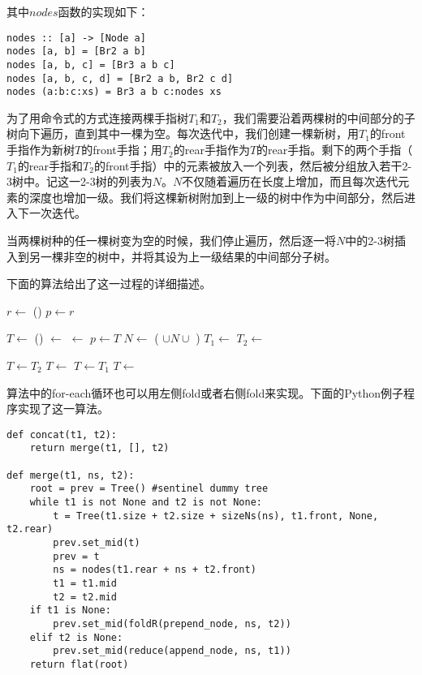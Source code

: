 \documentclass[UTF8]{article}
\begin{document}
其中$nodes$函数的实现如下：

\begin{lstlisting}[style=Haskell]
nodes :: [a] -> [Node a]
nodes [a, b] = [Br2 a b]
nodes [a, b, c] = [Br3 a b c]
nodes [a, b, c, d] = [Br2 a b, Br2 c d]
nodes (a:b:c:xs) = Br3 a b c:nodes xs
\end{lstlisting}

为了用命令式的方式连接两棵手指树$T_1$和$T_2$，我们需要沿着两棵树的中间部分的子树向下遍历，直到其中一棵为空。每次迭代中，我们创建一棵新树，用$T_1$的front手指作为新树$T$的front手指；用$T_2$的rear手指作为$T$的rear手指。剩下的两个手指（$T_1$的rear手指和$T_2$的front手指）中的元素被放入一个列表，然后被分组放入若干2-3树中。记这一2-3树的列表为$N$。$N$不仅随着遍历在长度上增加，而且每次迭代元素的深度也增加一级。我们将这棵新树附加到上一级的树中作为中间部分，然后进入下一次迭代。

当两棵树种的任一棵树变为空的时候，我们停止遍历，然后逐一将$N$中的2-3树插入到另一棵非空的树中，并将其设为上一级结果的中间部分子树。

下面的算法给出了这一过程的详细描述。

\begin{algorithmic}
  \State \Return {}
\EndFunction
\Statex
{}
  \State $r \gets$ ()
  \State $p \gets r$

    \State $T \gets$ ()
    \State {} $\gets$ 
    \State {} $\gets$ 
    \State {}
    \State $p \gets T$
    \State $N \gets$ ( $\cup N \cup$ )
    \State $T_1 \gets$ 
    \State $T_2 \gets$ 
  \EndWhile

    \State $T \gets T_2$
      \State $T \gets$ 
    \EndFor
    \State $T \gets T_1$
      \State $T \gets$ 
    \EndFor
  \EndIf
  \State {}

  \State \Return {}
\EndFunction
\end{algorithmic}

算法中的for-each循环也可以用左侧fold或者右侧fold来实现。下面的Python例子程序实现了这一算法。

\lstset{language=Python}
\begin{lstlisting}
def concat(t1, t2):
    return merge(t1, [], t2)

def merge(t1, ns, t2):
    root = prev = Tree() #sentinel dummy tree
    while t1 is not None and t2 is not None:
        t = Tree(t1.size + t2.size + sizeNs(ns), t1.front, None, t2.rear)
        prev.set_mid(t)
        prev = t
        ns = nodes(t1.rear + ns + t2.front)
        t1 = t1.mid
        t2 = t2.mid
    if t1 is None:
        prev.set_mid(foldR(prepend_node, ns, t2))
    elif t2 is None:
        prev.set_mid(reduce(append_node, ns, t1))
    return flat(root)
\end{lstlisting}
\end{document}
